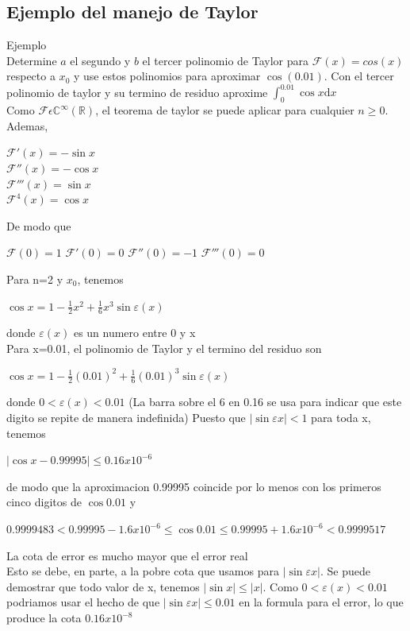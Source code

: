 \documentclass{article}
\begin{document}
\begin{multicols}{2}
\section{Ejemplo del manejo de Taylor}
\label{sec:Ejemplo}
Ejemplo
\\
Determine $a$ el segundo y $b$ el tercer polinomio de Taylor para $\mathcal{F}(x)=cos(x)$ respecto a $x_{0}$ y use estos polinomios para aproximar $\cos (0.01)$. Con el tercer polinomio de taylor y su termino de residuo aproxime $\int_0^{0.01}\cos x\mathrm{d}x$
\\
Como $\mathcal{F}\epsilon \mathbb{C}^{\infty} (\mathbb{R})
$, el teorema de taylor se puede aplicar para cualquier $n \geq 0 $. Ademas,
\\
\begin{center}
$\mathcal{F}'(x)=-\sin x $
\\
$\mathcal{F}''(x)=-\cos x$
\\
$\mathcal{F}'''(x)=\sin x$
\\
$\mathcal{F}^{4}(x)=\cos x$
\end{center}
De modo que 
\begin{center}
$\mathcal{F}(0)=1$
$\mathcal{F}'(0)=0$
$\mathcal{F}''(0)=-1$
$\mathcal{F}'''(0)=0$
\end{center}
Para n=2 y $x_{0}$, tenemos
\begin{center}
$\cos x = 1-\frac{1}{2}x^{2}+\frac{1}{6}x^{3}\sin \varepsilon (x)$
\end{center}
donde $\varepsilon (x)$ es un numero entre 0 y x
\\
Para x=0.01, el polinomio de Taylor y el termino del residuo son 
\begin{center}
$\cos x = 1-\frac{1}{2}(0.01)^{2}+\frac{1}{6}(0.01)^{3}\sin \varepsilon (x)$
\end{center}
donde $0< \varepsilon (x) < 0.01 $ (La barra sobre el 6 en 0.16 se usa para indicar que este digito se repite de manera indefinida) Puesto que $|\sin \varepsilon x|< 1$ para toda x, tenemos 
\begin{center}
$|\cos x - 0.99995 | \leq 0.16x10^{-6}$
\end{center}
de modo que la aproximacion 0.99995 coincide por lo menos con los primeros cinco digitos de $\cos 0.01$ y
\begin{center}
$0.9999483 < 0.99995 - 1.6x10^{-6} \leq \cos 0.01 \leq 0.99995 + 1.6x10^{-6} < 0.9999517 $
\end{center}
La cota de error es mucho mayor que el error real
\\
Esto se debe, en parte, a la  pobre cota que usamos para $|\sin \varepsilon x|$. Se puede demostrar que todo valor de x, tenemos $|\sin x| \leq |x|$. Como $0< \varepsilon (x) < 0.01 $ podriamos usar el hecho de que $|\sin \varepsilon x| \leq 0.01$ en la formula para el error, lo que produce la cota $0.16x10^{-8}$

\end{multicols}
\end{document}
